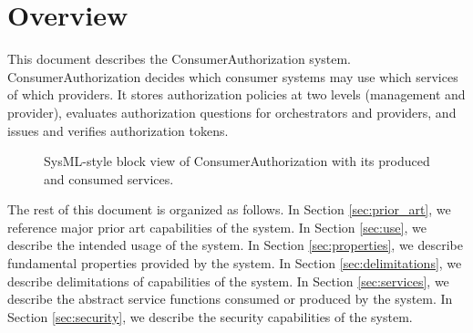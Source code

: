 \documentclass[a4paper]{arrowhead}
\begin{document}
\section{Overview}
\label{sec:overview}

This document describes the ConsumerAuthorization system. Consumer\allowbreak{}Authorization decides which consumer systems may use which services of which providers. It stores authorization policies at two levels (management and provider), evaluates authorization questions for orchestrators and providers, and issues and verifies authorization tokens.

\begin{figure}[ht!]
  \centering
  \caption{SysML-style block view of ConsumerAuthorization with its produced and consumed services.}
  \label{fig:system}
\end{figure}

The rest of this document is organized as follows.
In Section \ref{sec:prior_art}, we reference major prior art capabilities of the system.
In Section \ref{sec:use}, we describe the intended usage of the system.
In Section \ref{sec:properties}, we describe fundamental properties provided by the system.
In Section \ref{sec:delimitations}, we describe delimitations of capabilities of the system.
In Section \ref{sec:services}, we describe the abstract service functions consumed or produced by the system.
In Section \ref{sec:security}, we describe the security capabilities of the system.
\end{document}
